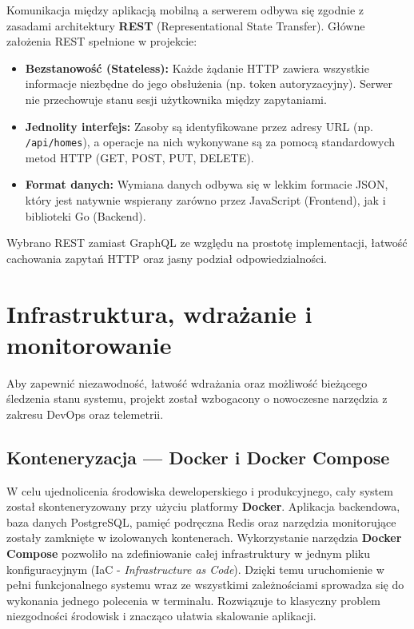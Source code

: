 Komunikacja między aplikacją mobilną a serwerem odbywa się zgodnie z zasadami architektury \textbf{REST} (Representational State Transfer).
Główne założenia REST spełnione w projekcie:
\begin{itemize}
    \item \textbf{Bezstanowość (Stateless):} Każde żądanie HTTP zawiera wszystkie informacje niezbędne do jego obsłużenia (np. token autoryzacyjny). Serwer nie przechowuje stanu sesji użytkownika między zapytaniami.
    \item \textbf{Jednolity interfejs:} Zasoby są identyfikowane przez adresy URL (np. \texttt{/api/homes}), a operacje na nich wykonywane są za pomocą standardowych metod HTTP (GET, POST, PUT, DELETE).
    \item \textbf{Format danych:} Wymiana danych odbywa się w lekkim formacie JSON, który jest natywnie wspierany zarówno przez JavaScript (Frontend), jak i biblioteki Go (Backend).
\end{itemize}

Wybrano REST zamiast GraphQL ze względu na prostotę implementacji, łatwość cachowania zapytań HTTP oraz jasny podział odpowiedzialności.

\section{Infrastruktura, wdrażanie i monitorowanie}

Aby zapewnić niezawodność, łatwość wdrażania oraz możliwość bieżącego śledzenia stanu systemu, projekt został wzbogacony o nowoczesne narzędzia z zakresu DevOps oraz telemetrii.

\subsection{Konteneryzacja --- Docker i Docker Compose}
W celu ujednolicenia środowiska deweloperskiego i produkcyjnego, cały system został skonteneryzowany przy użyciu platformy \textbf{Docker}. Aplikacja backendowa, baza danych PostgreSQL, pamięć podręczna Redis oraz narzędzia monitorujące zostały zamknięte w izolowanych kontenerach. 
Wykorzystanie narzędzia \textbf{Docker Compose} pozwoliło na zdefiniowanie całej infrastruktury w jednym pliku konfiguracyjnym (IaC - \textit{Infrastructure as Code}). Dzięki temu uruchomienie w pełni funkcjonalnego systemu wraz ze wszystkimi zależnościami sprowadza się do wykonania jednego polecenia w terminalu. Rozwiązuje to klasyczny problem niezgodności środowisk i znacząco ułatwia skalowanie aplikacji.



